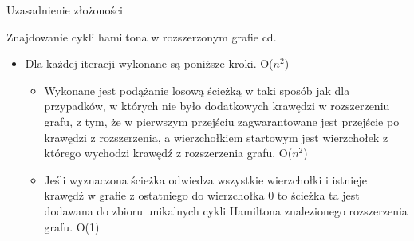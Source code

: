\documentclass{beamer}
\begin{document}
\begin{frame}{Uzasadnienie złożoności}
\begin{block}{Znajdowanie cykli hamiltona w rozszerzonym grafie cd.}
\justifying
\begin{itemize}

\begin{itemize}
    \item Dla każdej iteracji wykonane są poniższe kroki. O($n^2$) \\
    \begin{itemize}
        \item Wykonane jest podążanie losową ścieżką w taki sposób jak dla przypadków, w których nie było dodatkowych krawędzi w rozszerzeniu grafu, z tym, że w pierwszym przejściu zagwarantowane jest przejście po krawędzi z rozszerzenia, a wierzchołkiem startowym jest wierzchołek z którego wychodzi krawędź z rozszerzenia grafu. O($n^2$) \\
        \item Jeśli wyznaczona ścieżka odwiedza wszystkie wierzchołki i istnieje krawędź w grafie z ostatniego do wierzchołka 0 to ścieżka ta jest dodawana do zbioru unikalnych cykli Hamiltona znalezionego rozszerzenia grafu. O(1) \\ 
    \end{itemize}
\end{itemize}
\end{itemize}
\end{block}
\end{frame}
\end{document}

